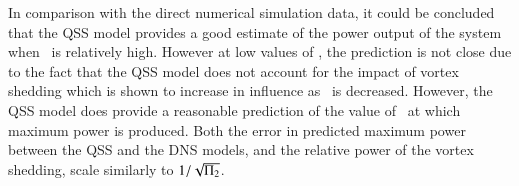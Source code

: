 In comparison with the direct numerical simulation data, it could be concluded that the QSS model provides a good estimate of the power output of the system when \massstiff\ is relatively high. However at low values of \massstiff, the prediction is not close due to the fact that the QSS model does not account for the impact of vortex shedding which is shown to increase in influence as \massstiff\ is decreased. However, the QSS model does provide a reasonable prediction of the value of \massdamp\ at which maximum power is produced. Both the error in predicted maximum power between the QSS and the DNS models, and the relative power of the vortex shedding, scale similarly to $1/\sqrt{\Pi_2}$.
  
  
  
  
 
 
 
 
 
 
 
 
 
 
 
 
 
 
 
 
 
 
 
 
 
 
 
 
 
 







